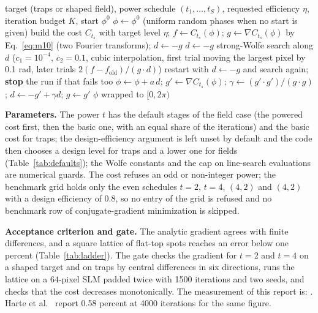 \begin{algorithm}[t]
\caption{Fletcher--Reeves conjugate gradient with a strong-Wolfe line search on the powered intensity cost, in stages of equal share of the iterations (the loop shared with the device-aware conjugate gradient, which differs by the forward model).}
\label{alg:m10}
\begin{algorithmic}[1]
\Require target (traps or shaped field), power schedule $(t_1,\dots,t_S)$, requested efficiency $\eta$, iteration budget $K$, start $\phi^0$
\State $\phi\gets\phi^0$ (uniform random phases when no start is given)
  \State build the cost $C_{t_s}$ with target level $\eta$; $f\gets C_{t_s}(\phi)$; $g\gets\nabla C_{t_s}(\phi)$ by Eq.~\eqref{eq:m10} (two Fourier transforms); $d\gets-g$
     \State $d\gets-g$ \EndIf
    \State strong-Wolfe search along $d$ ($c_1=10^{-4}$, $c_2=0.1$, cubic interpolation, first trial moving the largest pixel by 0.1 rad, later trials $2(f-f_{\mathrm{old}})/(g\cdot d)$)
     \State restart with $d\gets-g$ and search again; \textbf{stop} the run if that fails too \EndIf
    \State $\phi\gets\phi+a\,d$; $g'\gets\nabla C_{t_s}(\phi)$; $\gamma\gets(g'\cdot g')/(g\cdot g)$; $d\gets-g'+\gamma d$; $g\gets g'$
  \EndFor
\EndFor
\State \Return $\phi$ wrapped to $[0,2\pi)$
\end{algorithmic}
\end{algorithm}

\textbf{Parameters.} The power $t$ has the default stages of the field case (the powered cost first, then the basic one, with an equal share of the iterations) and the basic cost for traps; the design-efficiency argument is left unset by default and the code then chooses a design level for traps and a lower one for fields (Table~\ref{tab:defaults}); the Wolfe constants and the cap on line-search evaluations are numerical guards. The cost refuses an odd or non-integer power; the benchmark grid holds only the even schedules $t=2$, $t=4$, $(4,2)$ and $(4,2)$ with a design efficiency of 0.8, so no entry of the grid is refused and no benchmark row of conjugate-gradient minimization is skipped.

\textbf{Acceptance criterion and gate.} The analytic gradient agrees with finite differences, and a square lattice of flat-top spots reaches an error below one percent (Table~\ref{tab:ladder}). The gate checks the gradient for $t=2$ and $t=4$ on a shaped target and on traps by central differences in six directions, runs the lattice on a $64$-pixel SLM padded twice with 1500 iterations and two seeds, and checks that the cost decreases monotonically. The measurement of this report is: . Harte et al.~\cite{harte} report 0.58 percent at 4000 iterations for the same figure.

